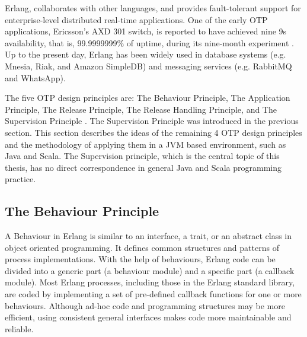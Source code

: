 Erlang, collaborates with other languages, and provides fault-tolerant support 
for enterprise-level distributed real-time applications. One of the early OTP 
applications, Ericsson’s AXD 301 switch, is reported to have achieved nine 9s 
availability, that is, 99.9999999\% of uptime, during its nine-month experiment 
\citep{ArmstrongAXD}.  Up to the present day, Erlang has been widely used in 
database systems (e.g. Mnesia, Riak, and Amazon SimpleDB) and messaging 
services (e.g. RabbitMQ and WhatsApp).


The five OTP design principles are: The Behaviour 
Principle, The Application Principle, The Release Principle, The Release 
Handling Principle, and The Supervision Principle \citep{OTP}.  The Supervision Principle 
was introduced in the previous section.  This section describes the ideas 
of the remaining 4 OTP design principles and the methodology of applying them 
in a JVM based environment, such as Java and Scala.  The Supervision principle, 
which is the central topic of this thesis, has no direct correspondence in 
general Java and Scala programming practice.



\subsection{The Behaviour Principle}

A Behaviour in Erlang is similar to an interface, a trait, or an abstract class
in object oriented programming.  It defines common structures and patterns of 
process implementations.  With the help of behaviours, Erlang code can be 
divided into a generic part (a behaviour module) and a specific part (a 
callback module).  Most Erlang processes, including those in the Erlang standard library,  are 
coded by implementing a set of pre-defined callback functions for one or 
more behaviours.  Although ad-hoc code and programming structures may be more 
efficient, using consistent general interfaces makes code more maintainable and 
reliable.  
\begin{comment}
Standard Erlang/OTP behaviours include: 

\begin{itemize} 
  \item $\it{gen\_server}$  for constructing the server of a client-server 
paradigm. 
  \item $\it{gen\_fsm}$ for constructing finite state machines. 
  \item $\it{gen\_event}$ for implementing event handling functionality. 
  \item $\it{supervisor}$ for implementing a supervisor in a supervision tree. 
\end{itemize}
\end{comment}

